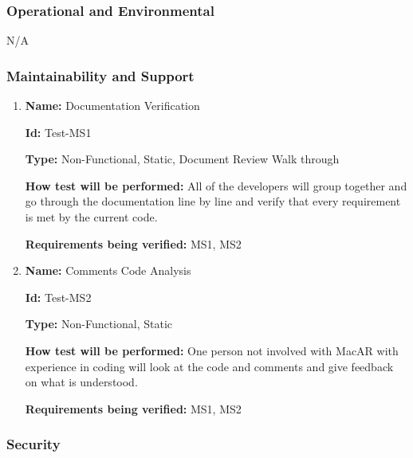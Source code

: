 \documentclass[12pt, titlepage]{article}
\begin{document}
\subsubsection{Operational and Environmental}

N/A

\subsubsection{Maintainability and Support}

\begin{enumerate}

\item{\textbf{Name:} Documentation Verification}

\textbf{Id:} Test-MS1

\textbf{Type:} Non-Functional, Static, Document Review Walk through
			
\textbf{How test will be performed:} All of the developers will group together and go through the documentation line by line and verify that every requirement is met by the current code.

\textbf{Requirements being verified:} MS1, MS2

\item{\textbf{Name:} Comments Code Analysis}

\textbf{Id:} Test-MS2

\textbf{Type:} Non-Functional, Static
					
\textbf{How test will be performed:} One person not involved with MacAR with experience in coding will look at the code and comments and give feedback on what is understood.

\textbf{Requirements being verified:} MS1, MS2

\end{enumerate}

\subsubsection{Security}
\end{document}
